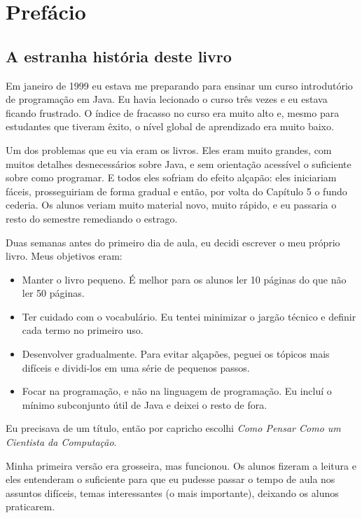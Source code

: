 \documentclass[10pt]{book}
\begin{document}
\chapter{Prefácio}

\section*{A estranha história deste livro}

Em janeiro de 1999 eu estava me preparando para ensinar um curso introdutório de
programação em Java. Eu havia lecionado o curso três vezes e eu estava ficando
frustrado. O índice de fracasso no curso era muito alto e, mesmo para
estudantes que tiveram êxito, o nível global de aprendizado era muito baixo.

Um dos problemas que eu via eram os livros.  
Eles eram muito grandes, com muitos detalhes desnecessários sobre Java, e
sem orientação acessível o suficiente sobre como programar. E todos eles
sofriam do efeito alçapão: eles iniciariam fáceis,
prosseguiriam de forma gradual e então, por volta do Capítulo 5 o fundo
cederia. Os alunos veriam muito material novo, muito rápido,
e eu passaria o resto do semestre remediando o estrago.

Duas semanas antes do primeiro dia de aula, eu decidi escrever o meu
próprio livro.
Meus objetivos eram:

\begin{itemize}

\item Manter o livro pequeno. É melhor para os alunos ler 10 páginas
do que não ler 50 páginas.

\item Ter cuidado com o vocabulário. Eu tentei minimizar o jargão técnico
e definir cada termo no primeiro uso.

\item Desenvolver gradualmente. Para evitar alçapões, peguei os tópicos
mais difíceis e dividi-los em uma série de pequenos passos.

\item Focar na programação, e não na linguagem de programação. Eu incluí
o mínimo subconjunto útil de Java e deixei o resto de fora.

\end{itemize}

Eu precisava de um título, então por capricho escolhi {\em Como Pensar Como
um Cientista da Computação}.

Minha primeira versão era grosseira, mas funcionou. Os alunos fizeram a leitura
e eles entenderam o suficiente para que eu pudesse passar o tempo de aula nos
assuntos difíceis, temas interessantes (o mais importante), deixando
os alunos praticarem.
\end{document}
